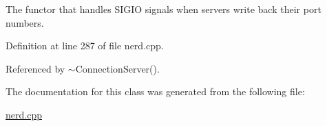 \-The functor that handles \-S\-I\-G\-I\-O signals when servers write back their port numbers. 



\-Definition at line 287 of file nerd.\-cpp.



\-Referenced by $\sim$\-Connection\-Server().



\-The documentation for this class was generated from the following file\-:\begin{DoxyCompactItemize}
\item 
\hyperlink{nerd_8cpp}{nerd.\-cpp}\end{DoxyCompactItemize}
